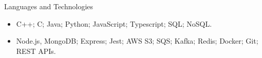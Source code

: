 \documentclass[]{mcdowellcv}
\begin{document}





	\begin{cvsection}{Languages and Technologies}
		\begin{cvsubsection}{}{}{}	
			\begin{itemize}
				\item C++; C; Java; Python; JavaScript; Typescript; SQL; NoSQL.
				\item Node.js, MongoDB; Express; Jest; AWS S3; SQS; Kafka; Redis; Docker; Git; REST APIs.
			\end{itemize}
		\end{cvsubsection}
	\end{cvsection}
	
\end{document}
